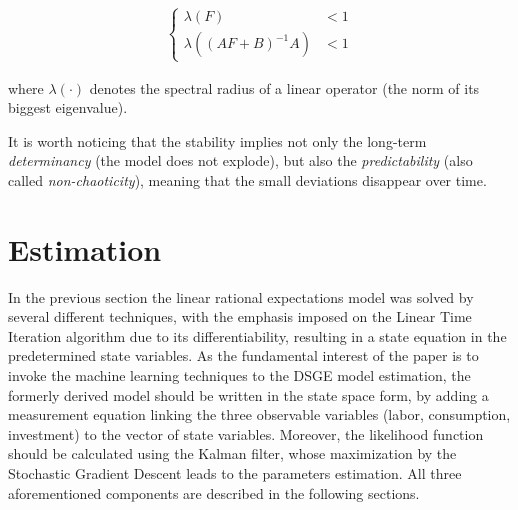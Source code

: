 \documentclass{pracamgr}
\numberwithin{equation}{section}
\newtheorem{mydef}{Definition}
\begin{document}
\begin{align}
\left\{
\begin{array}{cl}
\lambda(F) &< 1 \nonumber \\
\lambda \left( \left(AF + B \right)^{-1} A \right) &< 1 
\end{array}
\right.
\end{align}

where $\lambda(\cdot)$ denotes the spectral radius of a linear operator (the norm of its biggest eigenvalue).

It is worth noticing that the stability implies not only the long-term \textit{determinancy} (the model does not explode), but also the \textit{predictability} (also called \textit{non-chaoticity}), meaning that the small deviations disappear over time.

%
%
%

\chapter{Estimation} \label{Estimation}

In the previous section the linear rational expectations model was solved by several different techniques, with the emphasis imposed on the Linear Time Iteration algorithm due to its differentiability, resulting in a state equation in the predetermined state variables. As the fundamental interest of the paper is to invoke the machine learning techniques to the DSGE model estimation, the formerly derived model should be written in the state space form, by adding a measurement equation linking the three observable variables (labor, consumption, investment) to the vector of state variables. Moreover, the likelihood function should be calculated using the Kalman filter, whose maximization by the Stochastic Gradient Descent leads to the parameters estimation. All three aforementioned components are described in the following sections.
\end{document}

